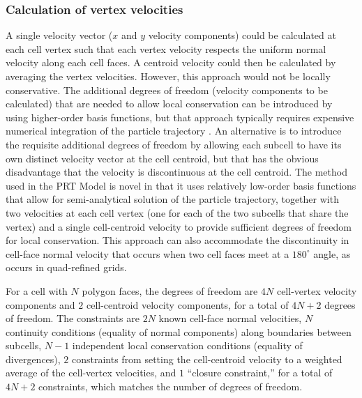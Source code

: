 \subsubsection{Calculation of vertex velocities}

A single velocity vector ($x$ and $y$ velocity components) could be calculated at each cell vertex such that each vertex velocity respects the uniform normal velocity along each cell faces. A centroid velocity could then be calculated by averaging the vertex velocities. However, this approach would not be locally conservative. The additional degrees of freedom (velocity components to be calculated) that are needed to allow local conservation can be introduced by using higher-order basis functions, but that approach typically requires expensive numerical integration of the particle trajectory \citep{zhang2012}. An alternative is to introduce the requisite additional degrees of freedom by allowing each subcell to have its own distinct velocity vector at the cell centroid, but that has the obvious disadvantage that the velocity is discontinuous at the cell centroid. The method used in the PRT Model is novel in that it uses relatively low-order basis functions that allow for semi-analytical solution of the particle trajectory, together with two velocities at each cell vertex (one for each of the two subcells that share the vertex) and a single cell-centroid velocity to provide sufficient degrees of freedom for local conservation. This approach can also accommodate the discontinuity in cell-face normal velocity that occurs when two cell faces meet at a $180^\circ$ angle, as occurs in quad-refined grids.

For a cell with $N$ polygon faces, the degrees of freedom are $4N$ cell-vertex velocity components and $2$ cell-centroid velocity components, for a total of $4N + 2$ degrees of freedom. The constraints are $2N$ known cell-face normal velocities, $N$ continuity conditions (equality of normal components) along boundaries between subcells, $N - 1$ independent local conservation conditions (equality of divergences), $2$ constraints from setting the cell-centroid velocity to a weighted average of the cell-vertex velocities, and $1$ ``closure constraint,'' for a total of $4N + 2$ constraints, which matches the number of degrees of freedom.

